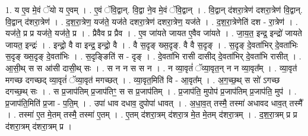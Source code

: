 \documentclass[17pt]{extarticle}
\begin{document}
1. य ए॒व मे॒वं ॅयो य ए॒वम् । . ए॒वं ॅवि॒द्वान्. वि॒द्वा ने॒व मे॒वं ॅवि॒द्वान् । . वि॒द्वान् द॑शरा॒त्रेण॑ दशरा॒त्रेण॑ वि॒द्वान्. वि॒द्वान् द॑शरा॒त्रेण॑ । . द॒श॒रा॒त्रेण॒ यज॑ते॒ यज॑ते दशरा॒त्रेण॑ दशरा॒त्रेण॒ यज॑ते । . द॒श॒रा॒त्रेणेति॑ दश - रा॒त्रेण॑ । . यज॑ते॒ प्र प्र यज॑ते॒ यज॑ते॒ प्र । . प्रैवैव प्र प्रैव । . ए॒व जा॑यते जायत ए॒वैव जा॑यते । . जा॒य॒त॒ इन्द्र॒ इन्द्रो॑ जायते जायत॒ इन्द्रः॑ । . इन्द्रो॒ वै वा इन्द्र॒ इन्द्रो॒ वै । . वै स॒दृङ् ख्स॒दृङ्. वै वै स॒दृङ् । . स॒दृङ् दे॒वता॑भिर् दे॒वता॑भिः स॒दृङ् ख्स॒दृङ् दे॒वता॑भिः । . स॒दृङ्ङिति॑ स - दृङ् । . दे॒वता॑भि रासी दासीद् दे॒वता॑भिर् दे॒वता॑भि रासीत् । . आ॒सी॒थ् स स आ॑सी दासी॒थ् सः । . स न न स स न । . न व्या॒वृतं॑ ॅव्या॒वृत॒न् न न व्या॒वृत᳚म् । . व्या॒वृत॑ मगच्छ दगच्छद् व्या॒वृतं॑ ॅव्या॒वृत॑ मगच्छत् । . व्या॒वृत॒मिति॑ वि - आ॒वृत᳚म् । . अ॒ग॒च्छ॒थ् स सो॑ ऽगच्छ दगच्छ॒थ् सः । . स प्र॒जाप॑तिम् प्र॒जाप॑तिꣳ॒॒ स स प्र॒जाप॑तिम् । . प्र॒जाप॑ति॒ मुपोप॑ प्र॒जाप॑तिम् प्र॒जाप॑ति॒ मुप॑ । . प्र॒जाप॑ति॒मिति॑ प्र॒जा - प॒ति॒म् । . उपा॑ धाव दधाव॒ दुपोपा॑ धावत् । . अ॒धा॒व॒त् तस्मै॒ तस्मा॑ अधावद धाव॒त् तस्मै᳚ । . तस्मा॑ ए॒त मे॒तम् तस्मै॒ तस्मा॑ ए॒तम् । . ए॒तम् द॑शरा॒त्रम् द॑शरा॒त्र मे॒त मे॒तम् द॑शरा॒त्रम् । . द॒श॒रा॒त्रम् प्र प्र द॑शरा॒त्रम् द॑शरा॒त्रम् प्र । \newline
\end{document}

